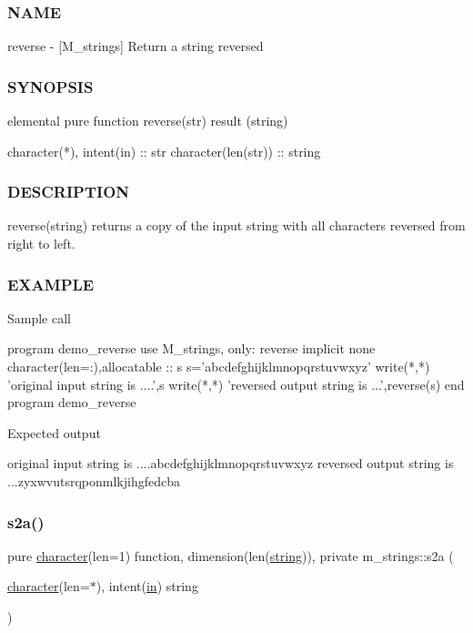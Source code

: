 \subsubsection*{N\+A\+ME}

reverse -\/ \mbox{[}M\+\_\+strings\mbox{]} Return a string reversed 

\subsubsection*{S\+Y\+N\+O\+P\+S\+IS}

\begin{DoxyVerb}elemental pure function reverse(str) result (string)

 character(*), intent(in) :: str
 character(len(str))      :: string
\end{DoxyVerb}


\subsubsection*{D\+E\+S\+C\+R\+I\+P\+T\+I\+ON}

reverse(string) returns a copy of the input string with all characters reversed from right to left.

\subsubsection*{E\+X\+A\+M\+P\+LE}

\begin{DoxyVerb}Sample call

   program demo_reverse
   use M_strings, only: reverse
   implicit none
   character(len=:),allocatable  :: s
      s='abcdefghijklmnopqrstuvwxyz'
      write(*,*) 'original input string is ....',s
      write(*,*) 'reversed output string is ...',reverse(s)
   end program demo_reverse

Expected output

  original input string is ....abcdefghijklmnopqrstuvwxyz
  reversed output string is ...zyxwvutsrqponmlkjihgfedcba \end{DoxyVerb}
 \mbox{\label{namespacem__strings_a5b05f337c8851871a4fb0b3cf56663cd}} 
\subsubsection{\texorpdfstring{s2a()}{s2a()}}
{\footnotesize\ttfamily pure \hyperlink{option__stopwatch_83_8txt_abd4b21fbbd175834027b5224bfe97e66}{character}(len=1) function, dimension(len(\hyperlink{what__overview_81_8txt_a74cb7e955273b9f9157b4f0c18a38849}{string})), private m\+\_\+strings\+::s2a (\begin{DoxyParamCaption}\item[{\hyperlink{option__stopwatch_83_8txt_abd4b21fbbd175834027b5224bfe97e66}{character}(len=$\ast$), intent(\hyperlink{M__journal_83_8txt_afce72651d1eed785a2132bee863b2f38}{in})}]{string }\end{DoxyParamCaption})\hspace{0.3cm}{\ttfamily [private]}}

